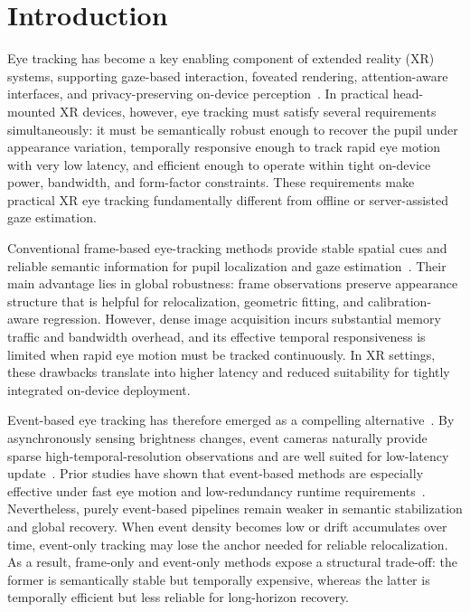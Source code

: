 ﻿\documentclass[journal]{IEEEtran}
\begin{document}
\section{Introduction}

Eye tracking has become a key enabling component of extended reality (XR) systems, supporting gaze-based interaction, foveated rendering, attention-aware interfaces, and privacy-preserving on-device perception~\cite{plopski2022eye,kwon2023xrbench}. In practical head-mounted XR devices, however, eye tracking must satisfy several requirements simultaneously: it must be semantically robust enough to recover the pupil under appearance variation, temporally responsive enough to track rapid eye motion with very low latency, and efficient enough to operate within tight on-device power, bandwidth, and form-factor constraints. These requirements make practical XR eye tracking fundamentally different from offline or server-assisted gaze estimation.

Conventional frame-based eye-tracking methods provide stable spatial cues and reliable semantic information for pupil localization and gaze estimation~\cite{li2018etracker,chen2022real,jain2025flattrack}. Their main advantage lies in global robustness: frame observations preserve appearance structure that is helpful for relocalization, geometric fitting, and calibration-aware regression. However, dense image acquisition incurs substantial memory traffic and bandwidth overhead, and its effective temporal responsiveness is limited when rapid eye motion must be tracked continuously. In XR settings, these drawbacks translate into higher latency and reduced suitability for tightly integrated on-device deployment.

Event-based eye tracking has therefore emerged as a compelling alternative~\cite{wang2024event,chen2025event}. By asynchronously sensing brightness changes, event cameras naturally provide sparse high-temporal-resolution observations and are well suited for low-latency update~\cite{li2024gaze,li2023track,ding2025facet,zhang2024swift,chen20233et,feng2022real,lai2026efficient,lenero20113}. Prior studies have shown that event-based methods are especially effective under fast eye motion and low-redundancy runtime requirements~\cite{li2023track,ding2025facet,chen20233et,feng2022real,lai2026efficient}. Nevertheless, purely event-based pipelines remain weaker in semantic stabilization and global recovery. When event density becomes low or drift accumulates over time, event-only tracking may lose the anchor needed for reliable relocalization. As a result, frame-only and event-only methods expose a structural trade-off: the former is semantically stable but temporally expensive, whereas the latter is temporally efficient but less reliable for long-horizon recovery.
\end{document}
